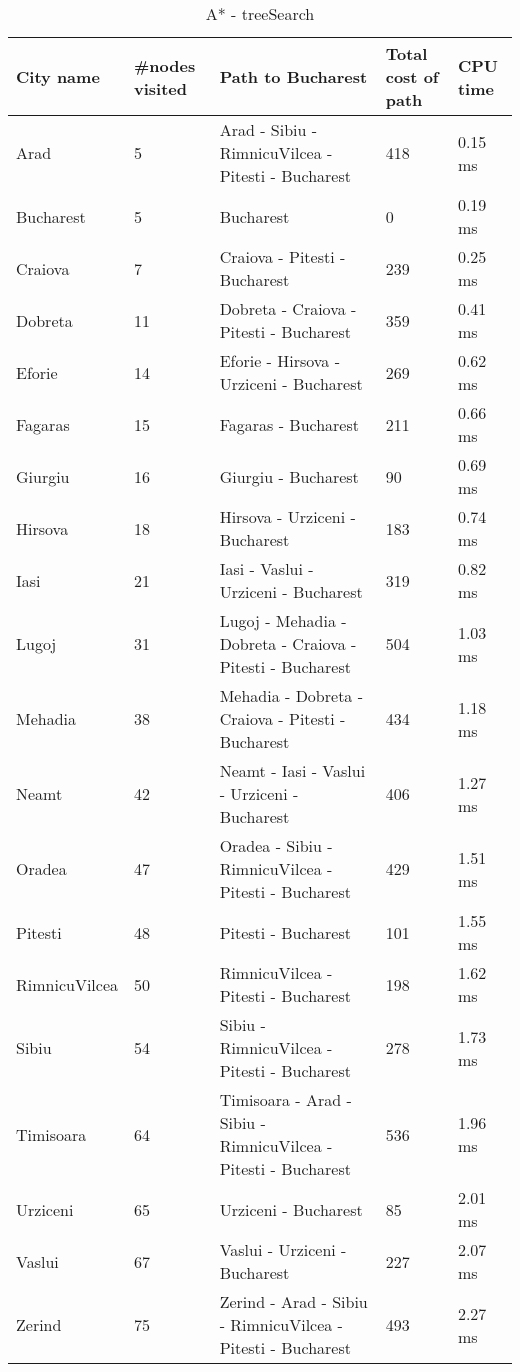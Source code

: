 \documentclass[a4paper]{article}
\begin{document}
\begin {table}[H]
\caption {A* - treeSearch}
\begin{center}
\begin{tabular}{ | l | l |  p{5cm} | l | l |} \hline
City name & \multicolumn{1}{l|}{\#nodes visited} & \multicolumn{1}{l|}{Path to Bucharest} & \multicolumn{1}{l|}{Total cost of path} & \multicolumn{1}{l|}{CPU time} \\ \hline
Arad & 5 & Arad - Sibiu - RimnicuVilcea - Pitesti - Bucharest & 418 & 0.15 ms \\ \hline
Bucharest & 5 & Bucharest & 0 & 0.19 ms \\ \hline
Craiova & 7 & Craiova - Pitesti - Bucharest & 239 & 0.25 ms \\ \hline
Dobreta & 11 & Dobreta - Craiova - Pitesti - Bucharest & 359 & 0.41 ms \\ \hline
Eforie & 14 & Eforie - Hirsova - Urziceni - Bucharest & 269 & 0.62 ms \\ \hline
Fagaras & 15 & Fagaras - Bucharest & 211 & 0.66 ms \\ \hline
Giurgiu & 16 & Giurgiu - Bucharest & 90 & 0.69 ms \\ \hline
Hirsova & 18 & Hirsova - Urziceni - Bucharest & 183 & 0.74 ms \\ \hline
Iasi & 21 & Iasi - Vaslui - Urziceni - Bucharest & 319 & 0.82 ms \\ \hline
Lugoj & 31 & Lugoj - Mehadia - Dobreta - Craiova - Pitesti - Bucharest & 504 & 1.03 ms \\ \hline
Mehadia & 38 & Mehadia - Dobreta - Craiova - Pitesti - Bucharest & 434 & 1.18 ms \\ \hline
Neamt & 42 & Neamt - Iasi - Vaslui - Urziceni - Bucharest & 406 & 1.27 ms \\ \hline
Oradea & 47 & Oradea - Sibiu - RimnicuVilcea - Pitesti - Bucharest & 429 & 1.51 ms \\ \hline
Pitesti & 48 & Pitesti - Bucharest & 101 & 1.55 ms \\ \hline
RimnicuVilcea & 50 & RimnicuVilcea - Pitesti - Bucharest & 198 & 1.62 ms \\ \hline
Sibiu & 54 & Sibiu - RimnicuVilcea - Pitesti - Bucharest & 278 & 1.73 ms \\ \hline
Timisoara & 64 & Timisoara - Arad - Sibiu - RimnicuVilcea - Pitesti - Bucharest & 536 & 1.96 ms \\ \hline
Urziceni & 65 & Urziceni - Bucharest & 85 & 2.01 ms \\ \hline
Vaslui & 67 & Vaslui - Urziceni - Bucharest & 227 & 2.07 ms \\ \hline
Zerind & 75 & Zerind - Arad - Sibiu - RimnicuVilcea - Pitesti - Bucharest & 493 & 2.27 ms \\ \hline
\end{tabular}
\end{center}
\end {table}
\end{document}
